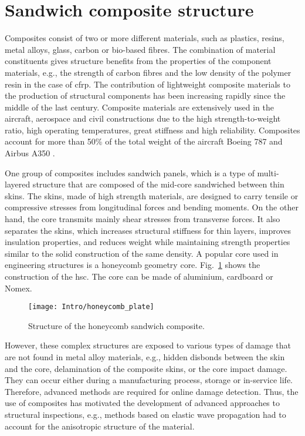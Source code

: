 \section{Sandwich composite structure}
\label{sec:scs}

Composites consist of two or more different materials, such as plastics, resins, metal alloys, glass, carbon or bio-based fibres. The combination of material constituents gives  structure benefits from the properties of the component materials, e.g., the strength of carbon fibres and the low density of the polymer resin in the case of \ac{cfrp}.
The contribution of lightweight composite materials to the production of structural components has been increasing rapidly since the middle of the last century.
Composite materials are extensively used in the aircraft, aerospace and civil constructions due to the high strength-to-weight ratio, high operating temperatures, great stiffness and high reliability.
Composites account for more than 50\% of the total weight of the aircraft Boeing 787 and Airbus A350 \cite{giurgiutiu2015structural}.

One group of composites includes sandwich panels, which is a type of multi-layered structure that are composed of the mid-core sandwiched between thin skins.
The skins, made of high strength materials, are designed to carry tensile or compressive stresses from longitudinal forces and bending moments.
On the other hand, the core transmits mainly shear stresses from transverse forces.
It also separates the skins, which increases structural stiffness for thin layers, improves insulation properties, and reduces weight while maintaining strength properties similar to the solid construction of the same density.
A popular core used in engineering structures is a honeycomb geometry core.
Fig.~\ref{fig:hcp} shows the construction of the \ac{hsc}.
The core can be made of aluminium, cardboard or Nomex. 
\begin{figure}[H] %
	\begin{center}
		\texttt{[image: Intro/honeycomb\_plate]}
		\caption{
			\label{fig:hcp} Structure of the honeycomb sandwich composite.}
		\vspace{-0.5cm}
	\end{center}
\end{figure}

However, these complex structures are exposed to various types of damage that are not found in metal alloy materials, e.g., hidden disbonds between the skin and the core, delamination of the composite skins, or the core impact damage.
They can occur either during a manufacturing process, storage or in-service life.
Therefore, advanced methods are required for online damage detection.
Thus, the use of composites has motivated the development of advanced approaches to structural inspections, e.g., methods based on elastic wave propagation had to account for the anisotropic structure of the material.